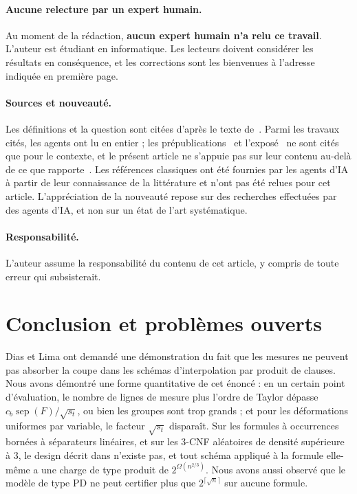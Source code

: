\documentclass[11pt,a4paper]{article}
\theoremstyle{definition}
\theoremstyle{remark}
\newcommand{\sep}{\operatorname{sep}}
\begin{document}
\paragraph{Aucune relecture par un expert humain.} Au moment de la rédaction, \textbf{aucun
expert humain n'a relu ce travail}. L'auteur est étudiant en informatique. Les lecteurs
doivent considérer les résultats en conséquence, et les corrections sont les bienvenues à
l'adresse indiquée en première page.

\paragraph{Sources et nouveauté.} Les définitions et la question sont citées d'après le
texte de~\cite{DL}. Parmi les travaux cités, les agents ont lu \cite{DL} en entier ; les
prépublications~\cite{OpenAI,Claude} et l'exposé~\cite{ODonnell} ne sont cités que pour le
contexte, et le présent article ne s'appuie pas sur leur contenu au-delà de ce que
rapporte~\cite{DL}. Les références classiques ont été fournies par les agents d'IA à partir
de leur connaissance de la littérature et n'ont pas été relues pour cet article.
L'appréciation de la nouveauté repose sur des recherches effectuées par des agents d'IA, et
non sur un état de l'art systématique.

\paragraph{Responsabilité.} L'auteur assume la responsabilité du contenu de cet article, y
compris de toute erreur qui subsisterait.

\section{Conclusion et problèmes ouverts}\label{sec:concl}

Dias et Lima ont demandé une démonstration du fait que les mesures ne peuvent pas absorber
la coupe dans les schémas d'interpolation par produit de clauses. Nous avons démontré une
forme quantitative de cet énoncé : en un certain point d'évaluation, le nombre de lignes de
mesure plus l'ordre de Taylor dépasse $c_b\sep(F)/\sqrt{s_t}$, ou bien les groupes sont trop
grands ; et pour les déformations uniformes par variable, le facteur $\sqrt{s_t}$ disparaît.
Sur les formules à occurrences bornées à séparateurs linéaires, et sur les 3-CNF aléatoires
de densité supérieure à $3$, le design décrit dans \cite[Section~9]{DL} n'existe pas, et
tout schéma appliqué à la formule elle-même a une charge de type produit de
$2^{\Omega(n^{2/3})}$. Nous avons aussi observé que le modèle de type PD ne peut certifier
plus que $2^{\lceil\sqrt n\rceil}$ sur aucune formule.
\end{document}

